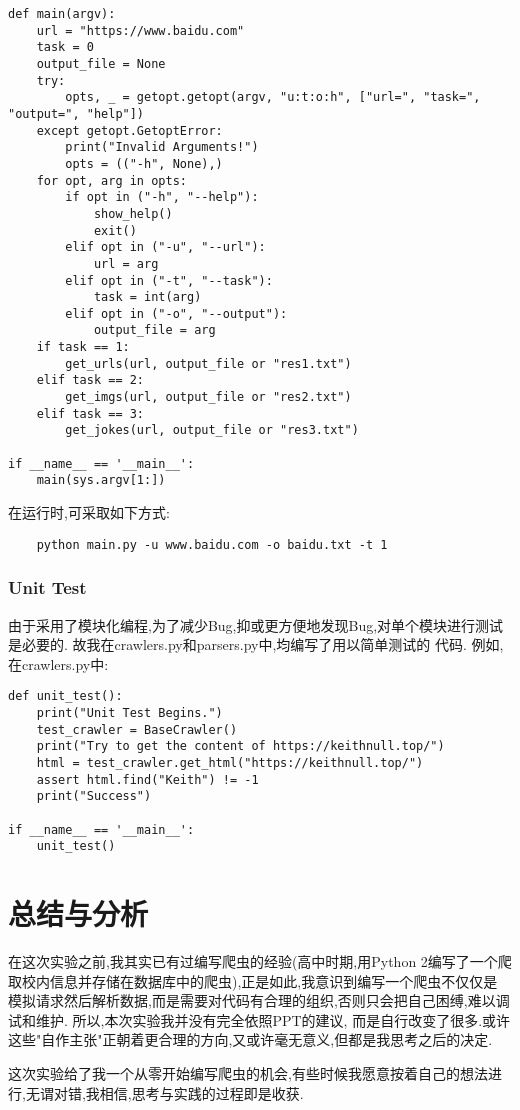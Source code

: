\documentclass[a4paper]{article}
\begin{document}
\begin{verbatim}
def main(argv):
    url = "https://www.baidu.com"
    task = 0
    output_file = None
    try:
        opts, _ = getopt.getopt(argv, "u:t:o:h", ["url=", "task=", "output=", "help"])
    except getopt.GetoptError:
        print("Invalid Arguments!")
        opts = (("-h", None),)
    for opt, arg in opts:
        if opt in ("-h", "--help"):
            show_help()
            exit()
        elif opt in ("-u", "--url"):
            url = arg
        elif opt in ("-t", "--task"):
            task = int(arg)
        elif opt in ("-o", "--output"):
            output_file = arg
    if task == 1:
        get_urls(url, output_file or "res1.txt")
    elif task == 2:
        get_imgs(url, output_file or "res2.txt")
    elif task == 3:
        get_jokes(url, output_file or "res3.txt")

if __name__ == '__main__':
    main(sys.argv[1:])
\end{verbatim}

在运行时,可采取如下方式:
\begin{verbatim}
    python main.py -u www.baidu.com -o baidu.txt -t 1
\end{verbatim}
            \subsubsection{Unit Test}
由于采用了模块化编程,为了减少Bug,抑或更方便地发现Bug,对单个模块进行测试是必要的. 故我在crawlers.py和parsers.py中,均编写了用以简单测试的
代码. 例如,在crawlers.py中:
\begin{verbatim}
def unit_test():
    print("Unit Test Begins.")
    test_crawler = BaseCrawler()
    print("Try to get the content of https://keithnull.top/")
    html = test_crawler.get_html("https://keithnull.top/")
    assert html.find("Keith") != -1
    print("Success")

if __name__ == '__main__':
    unit_test()
\end{verbatim}
    \newpage
    \section{总结与分析}
在这次实验之前,我其实已有过编写爬虫的经验(高中时期,用Python 2编写了一个爬取校内信息并存储在数据库中的爬虫),正是如此,我意识到编写一个爬虫不仅仅是
模拟请求然后解析数据,而是需要对代码有合理的组织,否则只会把自己困缚,难以调试和维护. 所以,本次实验我并没有完全依照PPT的建议,
而是自行改变了很多.或许这些"自作主张"正朝着更合理的方向,又或许毫无意义,但都是我思考之后的决定.

这次实验给了我一个从零开始编写爬虫的机会,有些时候我愿意按着自己的想法进行,无谓对错,我相信,思考与实践的过程即是收获.
\end{document}
